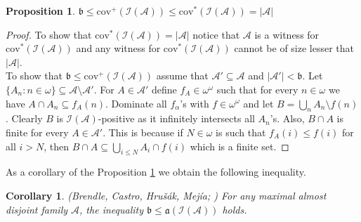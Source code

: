 \documentclass[a4paper]{amsart}
\newtheorem{proposition}[theorem]{Proposition}
\newtheorem{corollary}[theorem]{Corollary}
\newcommand{\aaa}{\mathfrak{a}}
\newcommand{\bbb}{\mathfrak{b}}
\newcommand{\Baire}{\omega^{\omega}}
\newcommand{\cov}{\mathrm{cov}}
\begin{document}
\begin{proposition}\label{covPlusForMad}
    $\bbb\leq\cov^{+}(\mathcal{I}(\mathcal{A}))\leq\cov^{*}(\mathcal{I}(\mathcal{A}))=|\mathcal{A}|$
\end{proposition}
\begin{proof}
    To show that $\cov^{*}(\mathcal{I}(\mathcal{A}))=|\mathcal{A}|$ notice that $\mathcal{A}$ is a witness for $\cov^{*}(\mathcal{I}(\mathcal{A}))$ and any witness for $\cov^{*}(\mathcal{I}(\mathcal{A}))$ cannot be of size lesser that $|\mathcal{A}|$.\\
    To show that $\bbb\leq\cov^{+}(\mathcal{I}(\mathcal{A}))$ assume that $\mathcal{A}'\subseteq \mathcal{A}$ and $|\mathcal{A}'|<\bbb$. Let $\{A_{n}:n\in\omega\}\subseteq\mathcal{A}\setminus\mathcal{A}'$. For $A\in\mathcal{A}'$ define $f_{A}\in\Baire$ such that for every $n\in\omega$ we have $A\cap A_{n}\subseteq f_{A}(n)$. Dominate all $f_{\alpha}$'s with $f\in\Baire$ and let $B=\bigcup_{n}A_{n}\setminus f(n)$. Clearly $B$ is $\mathcal{I}(\mathcal{A})$-positive as it infinitely intersects all $A_{n}$'s. Also, $B\cap A$ is finite for every $A\in\mathcal{A}'$. This is because if $N\in\omega$ is such that $f_{A}(i)\leq f(i)$ for all $i>N$, then $B\cap A\subseteq\bigcup_{i\leq N}A_{i}\cap f(i)$ which is a finite set.
\end{proof}
As a corollary of the Proposition \ref{covPlusForMad} we obtain the following inequality.
\begin{corollary}(Brendle, Castro, Hrušák, Mejía; \cite{BrendleCastro})
    For any maximal almost disjoint family $\mathcal{A}$, the inequality $\bbb\leq\aaa(\mathcal{I}(\mathcal{A}))$ holds.
\end{corollary}
\end{document}
